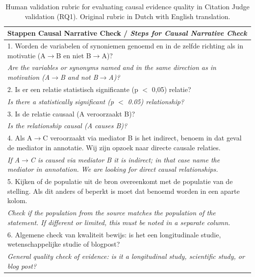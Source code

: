 
\begin{table}[htbp]
\centering
\caption[Human validation rubric for RQ1]{Human validation rubric for evaluating causal evidence quality in Citation Judge validation (RQ1). Original rubric in Dutch with English translation.}
\label{tab:human-validation-rubric-rq1}

\small
\begin{tabular}{p{}}
\toprule
\textbf{Stappen Causal Narrative Check} / \textit{Steps for Causal Narrative Check} \\
\midrule
1. Worden de variabelen of synoniemen genoemd en in de zelfde richting als in motivatie (A$\to$B en niet B$\to$A)? \\
\textit{Are the variables or synonyms named and in the same direction as in motivation (A$\to$B and not B$\to$A)?} \\[0.5em]

2. Is er een relatie statistisch significante (p $<$ 0,05) relatie? \\
\textit{Is there a statistically significant (p $<$ 0.05) relationship?} \\[0.5em]

3. Is de relatie causaal (A veroorzaakt B)? \\
\textit{Is the relationship causal (A causes B)?} \\[0.5em]

4. Als A$\to$C veroorzaakt via mediator B is het indirect, benoem in dat geval de mediator in annotatie. Wij zijn opzoek naar directe causale relaties. \\
\textit{If A$\to$C is caused via mediator B it is indirect; in that case name the mediator in annotation. We are looking for direct causal relationships.} \\[0.5em]

5. Kijken of de populatie uit de bron overeenkomt met de populatie van de stelling. Als dit anders of beperkt is moet dat benoemd worden in een aparte kolom. \\
\textit{Check if the population from the source matches the population of the statement. If different or limited, this must be noted in a separate column.} \\[0.5em]

6. Algemene check van kwaliteit bewijs: is het een longitudinale studie, wetenschappelijke studie of blogpost? \\
\textit{General quality check of evidence: is it a longitudinal study, scientific study, or blog post?} \\
\bottomrule
\end{tabular}


\end{table}
